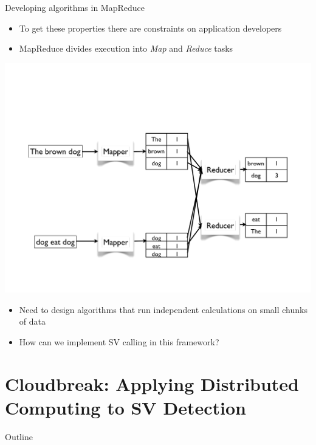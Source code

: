 \documentclass{beamer}
\begin{document}
\begin{frame}{Developing algorithms in MapReduce}
  \begin{itemize}
  \item To get these properties there are constraints on application developers
  \item MapReduce divides execution into \emph{Map} and \emph{Reduce} tasks
  \end{itemize}
  \begin{center}
    \includegraphics[trim=0 100 0 200, clip, width=\textwidth,height=0.52\textheight,keepaspectratio]{mapreduce_example.pdf}
   \end{center}
   \begin{itemize}
     \item Need to design algorithms that run independent calculations on small chunks of data
     \item How can we implement SV calling in this framework?
   \end{itemize}
\end{frame}


\section{Cloudbreak: Applying Distributed Computing to SV Detection}
\begin{frame}{Outline}
  \tableofcontents[currentsection]
\end{frame}
\end{document}
